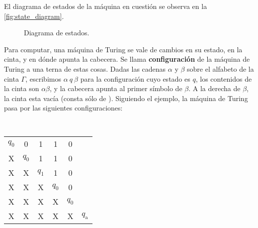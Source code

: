 \documentclass{article}
\theoremstyle{definition}
\begin{document}
El diagrama de estados de la máquina en cuestión se observa en la \autoref{fig:state_diagram}.

\begin{figure}[ht] %
\centering %
\caption{Diagrama de estados.}
\label{fig:state_diagram}
\end{figure}

Para computar, una máquina de Turing se vale de cambios en su estado, en la
cinta, y en dónde apunta la cabecera. Se llama \textbf{configuración} de la
máquina de Turing a una terna de estas cosas. Dadas las cadenas $\alpha$ y
$\beta$ sobre el alfabeto de la cinta $\Gamma$, escribimos $\alpha~q~\beta$ para
la configuración cuyo estado es $q$, los contenidos de la cinta son
$\alpha\beta$, y la cabecera apunta al primer símbolo de $\beta$. A la derecha
de $\beta$, la cinta esta vacía (consta sólo de \textvisiblespace). Siguiendo el
ejemplo, la máquina de Turing pasa por las siguientes configuraciones:
\begin{center}
{%
\setlength\tabcolsep{0mm}
\tt
 \begin{tabular}{cccccc}
   $q_0$ & 0   & 1 & 1 & 0 & \textvisiblespace \\
   X   & $q_0$ & 1 & 1 & 0 & \textvisiblespace \\
   X   & X & $q_1$ & 1 & 0 & \textvisiblespace \\
   X   & X & X & $q_0$ & 0 & \textvisiblespace \\
   X   & X & X & X & $q_0$ & \textvisiblespace \\
   X   & X & X & X & X & $q_{\text{a}}$\\
 \end{tabular}
 }
 \end{center}
\end{document}
